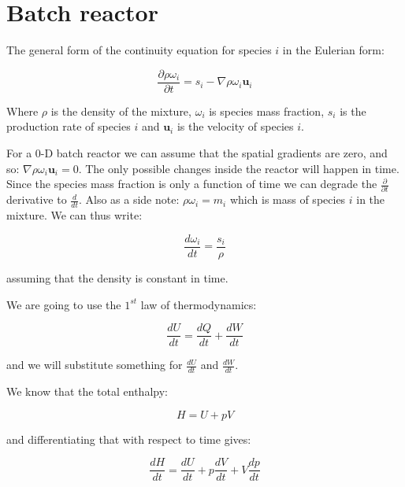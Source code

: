 \documentclass[10pt]{article}
\begin{document}
\newpage

\section{Batch reactor}

The general form of the continuity equation for species $i$ in the Eulerian form:

\begin{equation} \label{eq:species-mass-conservation}
\frac{\partial \rho \omega_i}{\partial t} = s_i - \nabla \rho \omega_i \mathbf{u}_{i}
\end{equation}

Where $\rho$ is the density of the mixture, $\omega_i$ is species mass fraction, $s_i$ is the production rate of species $i$ and $\mathbf{u}_i$ is the velocity of species $i$.

For a 0-D batch reactor we can assume that the spatial gradients are zero, and so: $ \nabla \rho \omega_i \mathbf{u}_{i} = 0$. The only possible changes inside the reactor will happen in time. Since the species mass fraction is only a function of time we can degrade the $\frac{\partial}{\partial t}$ derivative to $\frac{d}{dt}$. Also as a side note: $\rho \omega_i = m_i$ which is mass of species $i$ in the mixture. We can thus write:

\begin{equation} \label{eq:batch-reactor-species-mass}
\frac{d \omega_i}{dt} = \frac{s_i}{\rho}
\end{equation}

assuming that the density is constant in time.

We are going to use the $1^{st}$ law of thermodynamics:

\begin{equation}
\frac{dU}{dt} = \frac{dQ}{dt} + \frac{dW}{dt}
\end{equation}

and we will substitute something for $\frac{dU}{dt}$ and $\frac{dW}{dt}$.

We know that the total enthalpy:

\begin{equation}
H = U + p V
\end{equation}

and differentiating that with respect to time gives:

\begin{equation} \label{eq:enthalpy}
\frac{d H}{dt} = \frac{dU}{dt} + p \frac{dV}{dt} + V \frac{dp}{dt}
\end{equation}
\end{document}
